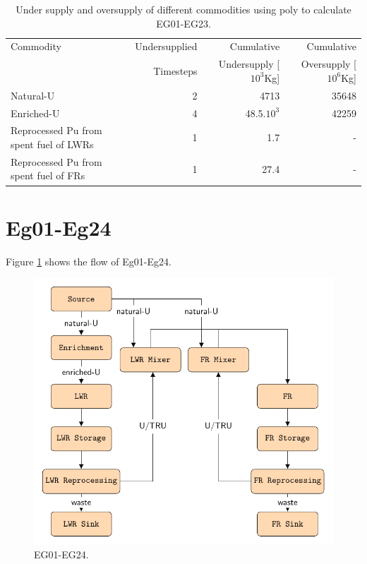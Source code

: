 \documentclass[11pt]{article}
\begin{document}
\begin{table}[H]
	\centering
	\caption{Under supply and oversupply of different commodities using poly to calculate EG01-EG23.}
	\label{tab:23-commod}
	\begin{tabularx}{\textwidth}{lRRR}
		\hline
		Commodity & Undersupplied & Cumulative  & Cumulative \\
		& Timesteps     & Undersupply [$10^3$Kg]  & Oversupply [$10^6$Kg] \\ \hline
		Natural-U & 2 & 4713  &  35648   \\ 
		Enriched-U & 4 & 48.5$.10^3$  &  42259   \\ 
        Reprocessed Pu from spent fuel of LWRs & 1 & 1.7 & - \\
        Reprocessed Pu from spent fuel of FRs & 1 & 27.4 & - \\ \hline
	\end{tabularx}
\end{table}

\section{Eg01-Eg24}

Figure \ref{fig:24flow} shows the flow of Eg01-Eg24.

\begin{figure}[H]
	\centering
	\includegraphics[width=\textwidth]{24-figures/24flow.pdf} 
	\hfill
	\caption{EG01-EG24.}
	\label{fig:24flow}
\end{figure}
\end{document}
